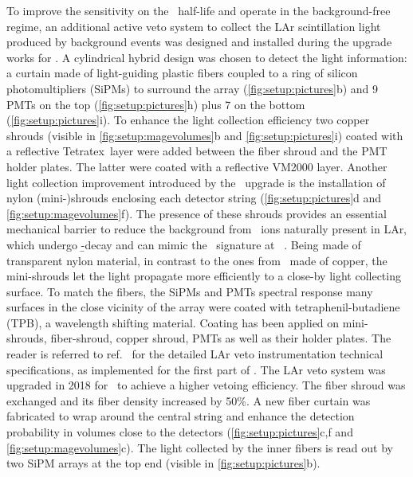 To improve the sensitivity on the \onbb\ half-life and operate in the background-free
regime, an additional active veto system to collect the LAr scintillation light produced
by background events was designed and installed during the upgrade works for \phasetwo. A
cylindrical hybrid design was chosen to detect the light information: a curtain made of
light-guiding plastic fibers coupled to a ring of silicon photomultipliers (SiPMs) to
surround the array (\cref{fig:setup:pictures}b) and 9 PMTs on the top
(\cref{fig:setup:pictures}h) plus 7 on the bottom (\cref{fig:setup:pictures}i). To enhance
the light collection efficiency two copper shrouds (visible in
\cref{fig:setup:magevolumes}b and \cref{fig:setup:pictures}i) coated with a reflective
Tetratex\reg\ layer were added between the fiber shroud and the PMT holder plates. The
latter were coated with a reflective VM2000 layer. Another light collection improvement
introduced by the \phasetwo\ upgrade is the installation of nylon (mini-)shrouds enclosing
each detector string (\cref{fig:setup:pictures}d and \cref{fig:setup:magevolumes}f). The
presence of these shrouds provides an essential mechanical barrier to reduce the
background from \kvz\ ions naturally present in LAr, which undergo \b-decay and can mimic
the \onbb\ signature at \qbb~\cite{Lubashevskiy2017}.  Being made of transparent nylon
material, in contrast to the ones from \phaseone\ made of copper, the mini-shrouds let the
light propagate more efficiently to a close-by light collecting surface. To match the
fibers, the SiPMs and PMTs spectral response many surfaces in the close vicinity of the
array were coated with tetraphenil-butadiene (TPB), a wavelength shifting material.
Coating has been applied on mini-shrouds, fiber-shroud, copper shroud, PMTs as well as
their holder plates. The reader is referred to ref.~\cite{Agostini2018a} for the detailed
LAr veto instrumentation technical specifications, as implemented for the first part of
\phasetwo.
\newpar
The LAr veto system was upgraded in 2018 for \phasetwop\ to achieve a higher vetoing
efficiency. The fiber shroud was exchanged and its fiber density increased by 50\%. A new
fiber curtain was fabricated to wrap around the central string and enhance the detection
probability in volumes close to the detectors (\cref{fig:setup:pictures}c,f and
\cref{fig:setup:magevolumes}c). The light collected by the inner fibers is read out by two
SiPM arrays at the top end (visible in \cref{fig:setup:pictures}b).

